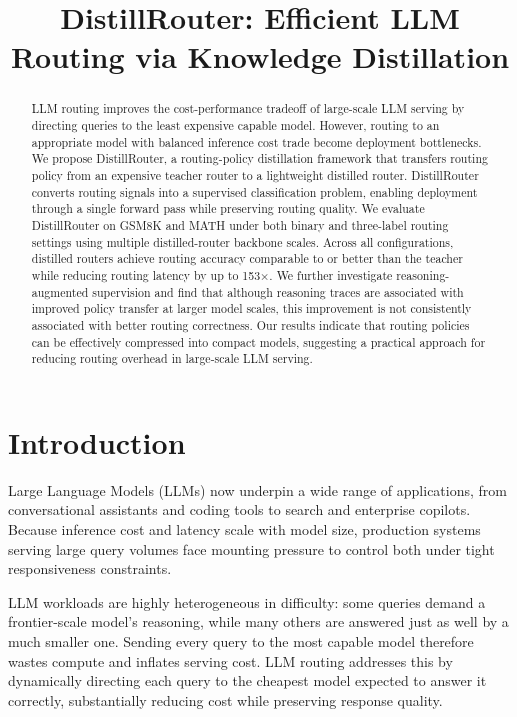 \documentclass{article}
\title{DistillRouter: Efficient LLM Routing via Knowledge Distillation}
\author{}
\begin{document}
\maketitle

\begin{abstract}
LLM routing improves the cost-performance tradeoff of large-scale LLM serving by directing queries to the least expensive capable model. However, routing to an appropriate model with balanced  inference cost trade become deployment bottlenecks. We propose DistillRouter, a routing-policy distillation framework that transfers routing policy from an expensive teacher router to a lightweight distilled router. DistillRouter converts routing signals into a supervised classification problem, enabling deployment through a single forward pass while preserving routing quality. We evaluate DistillRouter on GSM8K and MATH under both binary and three-label routing settings using multiple distilled-router backbone scales. Across all configurations, distilled routers achieve routing accuracy comparable to or better than the teacher while reducing routing latency by up to 153×. We further investigate reasoning-augmented supervision and find that although reasoning traces are associated with improved policy transfer at larger model scales, this improvement is not consistently associated with better routing correctness. Our results indicate that routing policies can be effectively compressed into compact models, suggesting a practical approach for reducing routing overhead in large-scale LLM serving.
\end{abstract}

\section{Introduction}
\label{sec:intro}

Large Language Models (LLMs) now underpin a wide range of applications, from conversational assistants and coding tools to search and enterprise copilots. Because inference cost and latency scale with model size, production systems serving large query volumes face mounting pressure to control both under tight responsiveness constraints.

LLM workloads are highly heterogeneous in difficulty: some queries demand a frontier-scale model's reasoning, while many others are answered just as well by a much smaller one. Sending every query to the most capable model therefore wastes compute and inflates serving cost. LLM routing addresses this by dynamically directing each query to the cheapest model expected to answer it correctly, substantially reducing cost while preserving response quality.
\end{document}
